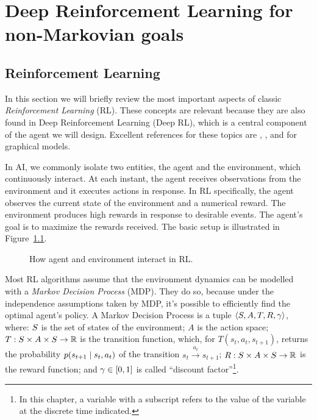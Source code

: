 \chapter{Deep Reinforcement Learning for non-Markovian goals}

\section{Reinforcement Learning}

In this section we will briefly review the most important aspects of classic
\emph{Reinforcement Learning} (RL). These concepts are relevant because they
are also found in Deep Reinforcement Learning (Deep RL), which is a central
component of the agent we will design. Excellent references for these topics
are \cite{bib:rl-book}, \cite{bib:probabilistic-rl}, and
\cite{bib:ml-book-murphy} for graphical models.

In AI, we commonly isolate two entities, the agent and the environment, which
continuously interact. At each instant, the agent receives observations from
the environment and it executes actions in response. In RL specifically, the
agent observes the current state of the environment and a numerical reward.
The environment produces high rewards in response to desirable events. The
agent's goal is to maximize the rewards received. The basic setup is
illustrated in Figure~\ref{fig:rl}.

\begin{figure}
	\centering
	\caption{How agent and environment interact in RL.}
	\label{fig:rl}
\end{figure}

Most RL algorithms assume that the environment dynamics can be modelled with a
\emph{Markov Decision Process} (MDP). They do so, because under the
independence assumptions taken by MDP, it's possible to efficiently find the
optimal agent's policy. A Markov Decision Process is a tuple $\langle S,
A, T, R, \gamma \rangle$, where: $S$ is the set of states of the
environment; $A$ is the action space; $T: S \times A \times S \to
\mathbb{R}$ is the transition function, which, for ${T(s_{t}, a_{t}, s_{t+1})}$,
returns the probability $p(s_{t+1} \mid s_{t}, a_{t})$ of the transition
${s_{t} \xrightarrow{a_{t}} s_{t+1}}$; $R: S \times A \times S \to
\mathbb{R}$ is the reward function; and $\gamma \in [0, 1]$ is called ``discount
factor''\footnote{In this chapter, a variable with a subscript refers to the
value of the variable at the discrete time indicated.}.

